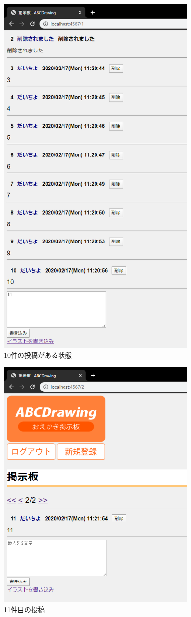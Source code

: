 \documentclass[a4j,titlepage]{jsarticle}
\begin{document}
\begin{figure}[H]
  \centering
  \includegraphics[width=10cm]{bbs07.png}
  \caption{10件の投稿がある状態}
  \label{f5}
\end{figure}

\begin{figure}[H]
  \centering
  \includegraphics[width=10cm]{bbs08.png}
  \caption{11件目の投稿}
  \label{f6}
\end{figure}
\end{document}
